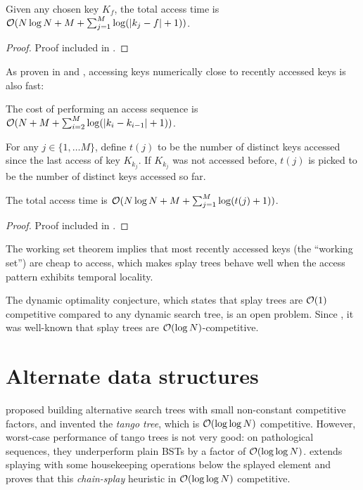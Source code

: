 \begin{theorem}
Given any chosen key $K_f$, the total access time is
$\mathcal{O}(N\log N + M + \sum_{j=1}^M \log(|k_j-f|+1))$.
\end{theorem}
\begin{proof}
	Proof included in \cite{splay}.
\end{proof}

As proven in \cite{dynamic-finger-1} and \cite{dynamic-finger-2},
accessing keys numerically close to recently accessed keys is also fast:
\begin{theorem}
The cost of performing an access sequence is
$\mathcal{O}(N+M+\sum_{i=2}^M \log(|k_i-k_{i-1}| + 1))$.
\end{theorem}

For any $j\in\{1,\ldots M\}$, define $t(j)$ to be the number of distinct
keys accessed since the last access of key $K_{k_j}$. If $K_{k_j}$ was not
accessed before, $t(j)$ is picked to be the number of distinct keys accessed
so far.
\begin{theorem}
The total access time is $\mathcal{O}(N\log N + M + \sum_{j=1}^M\log(t(j)+1))$.
\end{theorem}
\begin{proof}
	Proof included in \cite{splay}.
\end{proof}

The working set theorem implies that most recently accessed keys (the
``working set'') are cheap to access, which makes splay trees behave well when
the access pattern exhibits temporal locality.

The dynamic optimality conjecture, which states that splay trees are
$\mathcal{O}(1)$ competitive compared to any dynamic search tree, is an open problem.
Since \cite{splay}, it was well-known that splay trees are
$\mathcal{O}(\log N)$-competitive.

\section{Alternate data structures}
\cite{tango} proposed building alternative search trees with small
non-constant competitive factors, and invented the \emph{tango tree}, which
is $\mathcal{O}(\log\log N)$ competitive. However, worst-case performance of tango trees
is not very good: on pathological sequences, they underperform plain BSTs
by a factor of $\mathcal{O}(\log\log N)$.
\cite{chain-splaying} extends splaying with some housekeeping operations
below the splayed element and proves that this \emph{chain-splay} heuristic
in $\mathcal{O}(\log\log N)$ competitive.


